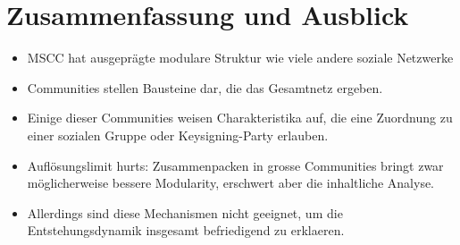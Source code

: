 
\chapter{Zusammenfassung und Ausblick}
\label{ch:Zusammenfassung}

\begin{itemize}
\item MSCC hat ausgepr\"agte modulare Struktur wie viele andere
  soziale Netzwerke
\item Communities stellen Bausteine dar, die das Gesamtnetz ergeben.
\item Einige dieser Communities weisen Charakteristika auf, die eine
  Zuordnung zu einer sozialen Gruppe oder Keysigning-Party erlauben.
\item Aufl\"osungslimit hurts: Zusammenpacken in grosse Communities
  bringt zwar m\"oglicherweise bessere Modularity, erschwert aber die
  inhaltliche Analyse.
\item Allerdings sind diese Mechanismen nicht geeignet, um die
  Entstehungsdynamik insgesamt befriedigend zu erklaeren.

\end{itemize}

